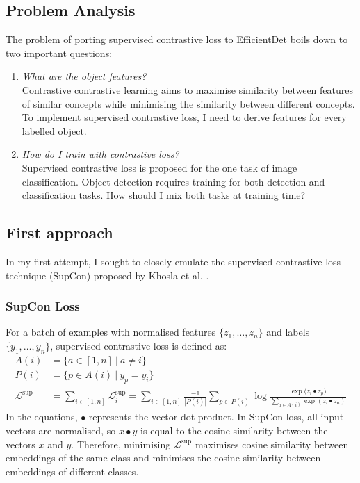 \documentclass[12pt,a4paper,twoside,openany]{report}
\newcommand{\suploss}{\mathcal{L}^\text{sup}}
\begin{document}
\subsection{Problem Analysis}
The problem of porting supervised contrastive loss to EfficientDet boils down to two important questions:
\begin{enumerate}
    \item \textit{What are the object features?}\\ 
    Contrastive contrastive learning aims to maximise similarity between features of similar concepts while minimising the similarity between different concepts. To implement supervised contrastive loss, I need to derive features for every labelled object.
    \item \textit{How do I train with contrastive loss?}\\
    Supervised contrastive loss \cite{khosla_supervised_2021} is proposed for the one task of image classification. Object detection requires training for both detection and classification tasks. How should I mix both tasks at training time?
\end{enumerate}

\subsection{First approach} \label{section: supcon_aproach_1}
In my first attempt, I sought to closely emulate the supervised contrastive loss technique (SupCon) proposed by Khosla et al. \cite{khosla_supervised_2021}.

\subsubsection{SupCon Loss}
For a batch of examples with normalised features $\{\mathit{z}_1, \dots, \mathit{z}_n\}$ and labels $\{y_1, \dots, y_n\}$, supervised contrastive loss is defined as:
\begin{align}
    A(i) &= \{a \in [1,n]\ |\ a \neq i\}\\
    P(i) &= \{p \in A(i)\ |\ y_p = y_i\}\\
    \suploss &= \sum\limits_{i\in [1, n]}\suploss_i=\sum\limits_{i\in [1, n]}\frac{-1}{|P(i)|}
    \sum\limits_{p\in P(i)}\log\frac{\exp{(\mathit{z}_i \bullet \mathit{z}_p})}{\sum\limits_{a \in A(i)}\exp{(\mathit{z}_i \bullet \mathit{z}_a)}} \label{eq:supcon}   
\end{align}
In the equations, $\bullet$ represents the vector dot product. In SupCon loss, all input vectors are normalised, so $x \bullet y$ is equal to the cosine similarity between the vectors $x$ and $y$. Therefore, minimising $\suploss$ maximises cosine similarity between embeddings of the same class and minimises the cosine similarity between embeddings of different classes.
\end{document}
